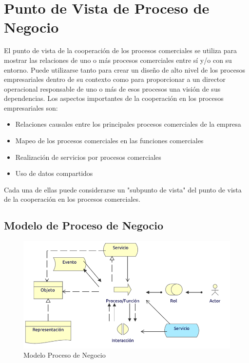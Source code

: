 \section{Punto de Vista de Proceso de Negocio}

El punto de vista de la cooperación de los procesos comerciales se utiliza para mostrar las relaciones de uno o más procesos comerciales entre sí y/o con su entorno. Puede utilizarse tanto para crear un diseño de alto nivel de los procesos empresariales dentro de su contexto como para proporcionar a un director operacional responsable de uno o más de esos procesos una visión de sus dependencias. Los aspectos importantes de la cooperación en los procesos empresariales son:

\begin{itemize}
	\item Relaciones causales entre los principales procesos comerciales de la empresa
	\item Mapeo de los procesos comerciales en las funciones comerciales
	\item Realización de servicios por procesos comerciales
	\item Uso de datos compartidos
\end{itemize}

Cada una de ellas puede considerarse un "subpunto de vista" del punto de vista de la cooperación en los procesos comerciales.

\subsection{Modelo de Proceso de Negocio}
\begin{figure}[h!]
	\centering
	\includegraphics[width=.8\linewidth]{imgs/modelo/ProcesoNegocio}
	\caption{Modelo Proceso de Negocio}
\end{figure}

